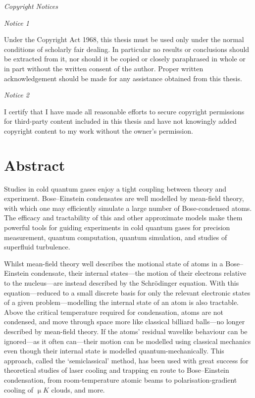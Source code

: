 \begin{center}
\begin{minipage}{0.95\textwidth}

\begin{center}
\textit{Copyright Notices}
\end{center}

{\textit{Notice 1}}

Under the Copyright Act 1968, this thesis must be used only under the normal conditions of scholarly fair dealing.
In particular no results or conclusions should be extracted from it, nor should it be copied or closely paraphrased in whole or in part without the written consent of the author.
Proper written acknowledgement should be made for any assistance obtained from this thesis.

\bigskip

{\textit {Notice 2}}

I certify that I have made all reasonable efforts to secure copyright permissions for third-party content included in this thesis and have not knowingly added copyright content to my work without the owner's permission.

\end{minipage}
\end{center}

\vspace*{\fill}
\vspace*{\fill}

\chapter*{Abstract}

Studies in cold quantum gases enjoy a tight coupling between theory and experiment. Bose--Einstein condensates are well modelled by mean-field theory, with which one may efficiently simulate a large number of Bose-condensed atoms. The efficacy and tractability of this and other approximate models make them powerful tools for guiding experiments in cold quantum gases for precision measurement, quantum computation, quantum simulation, and studies of superfluid turbulence.

Whilst mean-field theory well describes the motional state of atoms in a Bose--Einstein condensate, their internal states---the motion of their electrons relative to the nucleus---are instead described by the Schr\"odinger equation. With this equation---reduced to a small discrete basis for only the relevant electronic states of a given problem---modelling the internal state of an atom is also tractable. Above the critical temperature required for condensation, atoms are not condensed, and move through space more like classical billiard balls---no longer described by mean-field theory. If the atoms' residual wavelike behaviour can be ignored---as it often can---their motion can be modelled using classical mechanics even though their internal state is modelled quantum-mechanically. This approach, called the `semiclassical' method, has been used with great success for theoretical studies of laser cooling and trapping en route to Bose--Einstein condensation, from room-temperature atomic beams to polarisation-gradient cooling of $\unit{\upmu K}$ clouds, and more.

